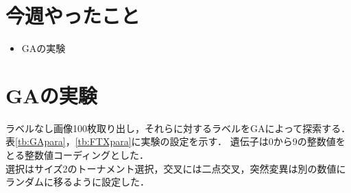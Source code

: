 \documentclass[twocolumn]{jarticle}     %
\begin{document}


\section{今週やったこと}

\begin{itemize}
	\item GAの実験
\end{itemize}

\section{GAの実験}

ラベルなし画像100枚取り出し，それらに対するラベルをGAによって探索する．
表\ref{tb:GApara}，\ref{tb:FTXpara}に実験の設定を示す．
遺伝子は0から9の整数値をとる整数値コーディングとした．\\
選択はサイズ2のトーナメント選択，交叉には二点交叉，突然変異は別の数値にランダムに移るように設定した．\\

\begin{table}[h]
	\centering
	\caption{GAの設定\label{tb:GApara}}
\end{table}
\end{document}
